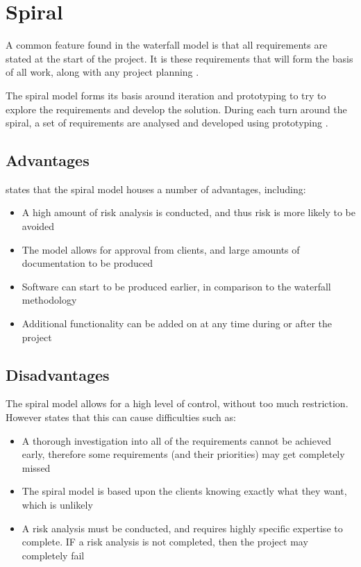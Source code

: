 \section{Spiral}

A common feature found in the waterfall model is that all requirements are 
stated at the start of the project. It is these requirements that will form the
basis of all work, along with any project planning \citep{cadle10}.

The spiral model forms its basis around iteration and prototyping to try to 
explore the requirements and develop the solution. During each turn around the
spiral, a set of requirements are analysed and developed using prototyping 
\citep{cadle10}.


\subsection{Advantages}
\citet{cadle10} states that the spiral model houses a number of advantages, 
including:

\begin{itemize}
  \item A high amount of risk analysis is conducted, and thus risk is more 
  likely to be avoided
  \item The model allows for approval from clients, and large amounts of 
  documentation to be produced
  \item Software can start to be produced earlier, in comparison to the 
  waterfall methodology
  \item Additional functionality can be added on at any time during or after 
  the project
\end{itemize}


\subsection{Disadvantages}
The spiral model allows for a high level of control, without too much 
restriction. However \citet{cadle10} states that this can cause difficulties 
such as:

\begin{itemize}
  \item A thorough investigation into all of the requirements cannot be 
  achieved early, therefore some requirements (and their priorities) may get 
  completely missed
  \item The spiral model is based upon the clients knowing exactly what they 
  want, which is unlikely
  \item A risk analysis must be conducted, and requires highly specific 
  expertise to complete. IF a risk analysis is not completed, then the project
  may completely fail 
\end{itemize}
